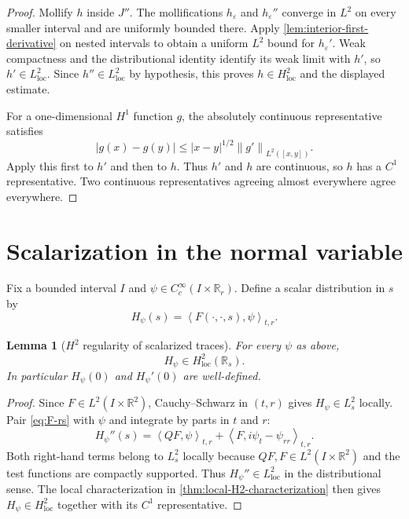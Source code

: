 \documentclass[11pt,oneside]{book}
\newtheorem{lemma}[theorem]{Lemma}
\theoremstyle{definition}
\theoremstyle{remark}
\newcommand{\R}{\mathbb R}
\newcommand{\1}{\mathbf 1}
\newcommand{\loc}{\mathrm{loc}}
\newcommand{\norm}[1]{\left\lVert #1\right\rVert}
\newcommand{\pair}[2]{\left\langle #1,#2\right\rangle}
\newcommand{\eps}{\varepsilon}
\begin{document}
\begin{proof}
Mollify $h$ inside $J''$.  The mollifications $h_\eps$ and
$h_\eps''$ converge in $L^2$ on every smaller interval and are uniformly
bounded there.  Apply \cref{lem:interior-first-derivative} on nested
intervals to obtain a uniform $L^2$ bound for $h_\eps'$.  Weak compactness
and the distributional identity identify its weak limit with $h'$, so
$h'\in L^2_{\loc}$.  Since $h''\in L^2_{\loc}$ by hypothesis, this proves
$h\in H^2_{\loc}$ and the displayed estimate.

For a one-dimensional $H^1$ function $g$, the absolutely continuous
representative satisfies
\[
 |g(x)-g(y)|\le|x-y|^{1/2}\norm{g'}_{L^2([x,y])}.
\]
Apply this first to $h'$ and then to $h$.  Thus $h'$ and $h$ are continuous,
so $h$ has a $C^1$ representative.  Two continuous representatives agreeing
almost everywhere agree everywhere.
\end{proof}

\section{Scalarization in the normal variable}
Fix a bounded interval $I$ and
$\psi\in C_c^\infty(I\times\R_r)$.  Define a scalar distribution in $s$ by
\begin{equation}
 H_\psi(s)=\pair{F(\cdot,\cdot,s)}{\psi}_{t,r}.     \label{eq:Hpsi-def}
\end{equation}

\begin{lemma}[$H^2$ regularity of scalarized traces]\label{lem:Hpsi-H2}
For every $\psi$ as above,
\[
 H_\psi\in H^2_{\loc}(\R_s).
\]
In particular $H_\psi(0)$ and $H_\psi'(0)$ are well-defined.
\end{lemma}

\begin{proof}
Since $F\in L^2(I\times\R^2)$, Cauchy--Schwarz in $(t,r)$ gives
$H_\psi\in L^2_s$ locally.  Pair \eqref{eq:F-rs} with $\psi$ and integrate by
parts in $t$ and $r$:
\begin{equation}
 H_\psi''(s)
 =\pair{QF}{\psi}_{t,r}
  +\pair F{i\psi_t-\psi_{rr}}_{t,r}.               \label{eq:Hpsi-second}
\end{equation}
Both right-hand terms belong to $L^2_s$ locally because
$QF,F\in L^2(I\times\R^2)$ and the test functions are compactly supported.
Thus $H_\psi''\in L^2_{\loc}$ in the distributional sense.  The local characterization in
\cref{thm:local-H2-characterization} then gives
$H_\psi\in H^2_{\loc}$ together with its $C^1$ representative.
\end{proof}
\end{document}
